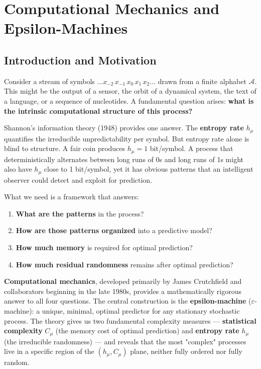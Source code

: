 \chapter{Computational Mechanics and Epsilon-Machines}

\section{Introduction and Motivation}

Consider a stream of symbols $\ldots x_{-2}\, x_{-1}\, x_0\, x_1\, x_2 \ldots$ drawn from a finite alphabet $\mathcal{A}$. This might be the output of a sensor, the orbit of a dynamical system, the text of a language, or a sequence of nucleotides. A fundamental question arises: \textbf{what is the intrinsic computational structure of this process?}

Shannon's information theory (1948) provides one answer. The \textbf{entropy rate} $h_\mu$ quantifies the irreducible unpredictability per symbol. But entropy rate alone is blind to structure. A fair coin produces $h_\mu = 1$ bit/symbol. A process that deterministically alternates between long runs of 0s and long runs of 1s might also have $h_\mu$ close to 1 bit/symbol, yet it has obvious patterns that an intelligent observer could detect and exploit for prediction.

What we need is a framework that answers:

\begin{enumerate}
\item \textbf{What are the patterns} in the process?
\item \textbf{How are those patterns organized} into a predictive model?
\item \textbf{How much memory} is required for optimal prediction?
\item \textbf{How much residual randomness} remains after optimal prediction?
\end{enumerate}

\textbf{Computational mechanics}, developed primarily by James Crutchfield and collaborators beginning in the late 1980s, provides a mathematically rigorous answer to all four questions. The central construction is the \textbf{epsilon-machine} ($\varepsilon$-machine): a unique, minimal, optimal predictor for any stationary stochastic process. The theory gives us two fundamental complexity measures --- \textbf{statistical complexity} $C_\mu$ (the memory cost of optimal prediction) and \textbf{entropy rate} $h_\mu$ (the irreducible randomness) --- and reveals that the most "complex" processes live in a specific region of the $(h_\mu, C_\mu)$ plane, neither fully ordered nor fully random.

